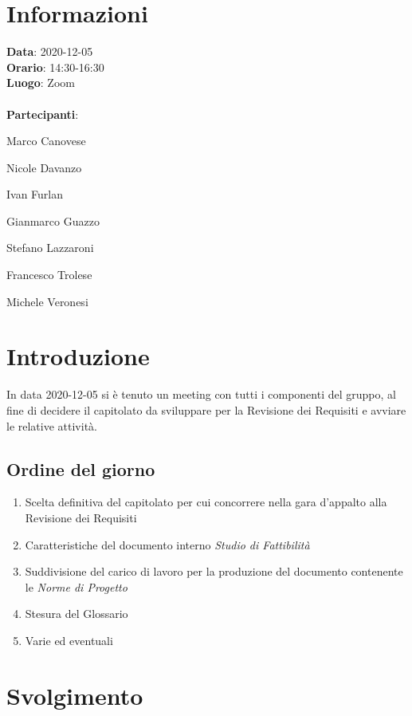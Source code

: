 \section{Informazioni}
\textbf{Data}: 2020-12-05\\
\textbf{Orario}: 14:30-16:30\\
\textbf{Luogo}: Zoom\\\\
\textbf{Partecipanti}:\begin{list}{*}{\setlength{\itemsep}{0cm}}
	\item Marco Canovese
	\item Nicole Davanzo
	\item Ivan Furlan
	\item Gianmarco Guazzo
	\item Stefano Lazzaroni
	\item Francesco Trolese
	\item Michele Veronesi
\end{list}

\section{Introduzione}
In data 2020-12-05 si è tenuto un meeting con tutti i componenti del gruppo, al fine
di decidere il capitolato da sviluppare per la Revisione dei Requisiti e avviare le relative attività.

\subsection{Ordine del giorno}
\begin{enumerate}
    \item Scelta definitiva del capitolato per cui concorrere nella gara d'appalto alla Revisione dei Requisiti
    \item Caratteristiche del documento interno \textit{Studio di Fattibilità}
    \item Suddivisione del carico di lavoro per la produzione del documento contenente le \textit{Norme di Progetto}
    \item Stesura del Glossario
    \item Varie ed eventuali
\end{enumerate}

\section{Svolgimento}
